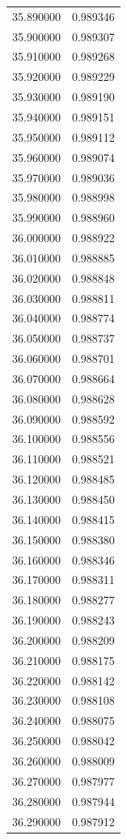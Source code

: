 \begin{tabular}{rr}
35.890000 & 0.989346 \\
35.900000 & 0.989307 \\
35.910000 & 0.989268 \\
35.920000 & 0.989229 \\
35.930000 & 0.989190 \\
35.940000 & 0.989151 \\
35.950000 & 0.989112 \\
35.960000 & 0.989074 \\
35.970000 & 0.989036 \\
35.980000 & 0.988998 \\
35.990000 & 0.988960 \\
36.000000 & 0.988922 \\
36.010000 & 0.988885 \\
36.020000 & 0.988848 \\
36.030000 & 0.988811 \\
36.040000 & 0.988774 \\
36.050000 & 0.988737 \\
36.060000 & 0.988701 \\
36.070000 & 0.988664 \\
36.080000 & 0.988628 \\
36.090000 & 0.988592 \\
36.100000 & 0.988556 \\
36.110000 & 0.988521 \\
36.120000 & 0.988485 \\
36.130000 & 0.988450 \\
36.140000 & 0.988415 \\
36.150000 & 0.988380 \\
36.160000 & 0.988346 \\
36.170000 & 0.988311 \\
36.180000 & 0.988277 \\
36.190000 & 0.988243 \\
36.200000 & 0.988209 \\
36.210000 & 0.988175 \\
36.220000 & 0.988142 \\
36.230000 & 0.988108 \\
36.240000 & 0.988075 \\
36.250000 & 0.988042 \\
36.260000 & 0.988009 \\
36.270000 & 0.987977 \\
36.280000 & 0.987944 \\
36.290000 & 0.987912 \\

\end{tabular}
